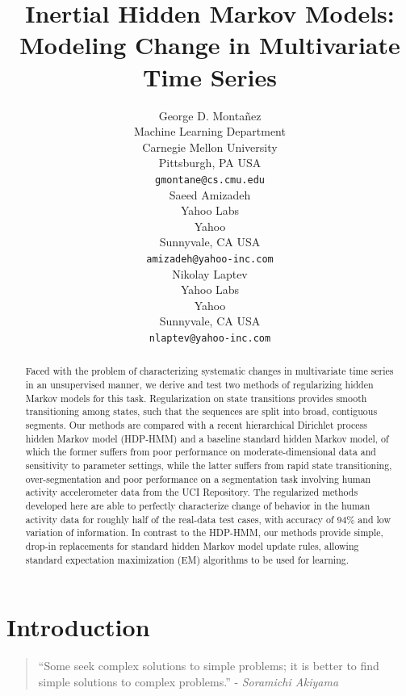 \documentclass[letterpaper]{article}
\title{Inertial Hidden Markov Models: Modeling Change in Multivariate Time Series}
\author{George D. Monta\~nez \\
Machine Learning Department\\
Carnegie Mellon University\\
Pittsburgh, PA USA\\
\texttt{gmontane@cs.cmu.edu} \\
\And
Saeed Amizadeh\\
Yahoo Labs\\
Yahoo\\
Sunnyvale, CA USA\\
\texttt{amizadeh@yahoo-inc.com}\\
\And
Nikolay Laptev\\
Yahoo Labs\\
Yahoo\\
Sunnyvale, CA USA\\
\texttt{nlaptev@yahoo-inc.com}}
\newenvironment{dedication}
        {\vspace{0.0ex}\begin{quotation}\begin{center}\begin{em}}
        {\par\end{em}\end{center}\end{quotation}}
\begin{document}
\maketitle

\begin{abstract}
    Faced with the problem of characterizing systematic changes in multivariate
    time series in an unsupervised manner, we derive and test two methods of regularizing hidden
    Markov models for this task. Regularization on state transitions provides
    smooth transitioning among states, such that the sequences are split into
    broad, contiguous segments. Our methods are compared with a recent
    hierarchical Dirichlet process hidden Markov model (HDP-HMM) and a baseline
    standard hidden Markov model, of which the former suffers from poor
    performance on moderate-dimensional data and sensitivity to parameter
    settings, while the latter suffers from rapid state transitioning,
    over-segmentation and poor performance on a segmentation task involving
    human activity accelerometer data from the UCI Repository.
    The regularized methods developed here are able to perfectly characterize
    change of behavior in the human activity data for roughly half of the real-data
    test cases, with accuracy of 94\% and low variation of information. In contrast to the
    HDP-HMM, our methods provide simple, drop-in replacements for standard
    hidden Markov model update rules, allowing standard expectation maximization
    (EM) algorithms to be used for learning. 
\end{abstract}

\section{Introduction}

\begin{dedication} ``Some seek complex solutions to simple problems; it is better to find simple solutions to complex problems.'' - \emph{Soramichi Akiyama}
\end{dedication}
\end{document}
